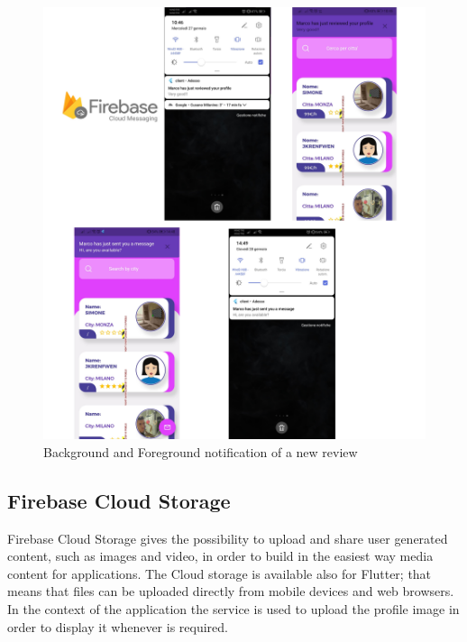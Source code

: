 \documentclass[../../dd.tex]{subfiles}
\begin{document}
    \begin{figure}[H]
        \centering
        \includegraphics[scale=0.2]{../../assets/fcm.jpg}
        \caption{Background and Foreground notification of a new review}\label{fig:widget-tests}
    \end{figure}

    \newpage
    \subsection{Firebase Cloud Storage}
    Firebase Cloud Storage gives the possibility to upload and share user generated content, such as images and video, in order to build in the easiest way media content for applications. The Cloud storage is available also for Flutter; that means that files can be uploaded directly from mobile devices and web browsers. In the context of the application the service is used to upload the profile image in order to display it whenever is required.
\end{document}
